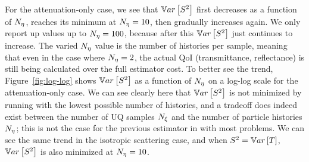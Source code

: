 For the attenuation-only case, we see that $\mathbb{V}ar\left[S^2\right]$ first decreases as a function of ${N_\eta}$, reaches its minimum at ${N_\eta}=10$, then gradually increases again. We only report up values up to ${N_\eta}=100$, because after this $\mathbb{V}ar\left[S^2\right]$ just continues to increase. The varied ${N_\eta}$ value is the number of histories per sample, meaning that even in the case where ${N_\eta}=2$, the actual QoI (transmittance, reflectance) is still being calculated over the full estimator cost. To better see the trend, Figure~\ref{fig:log-log} shows $\mathbb{V}ar\left[S^2\right]$ as a function of ${N_\eta}$ on a log-log scale for the attenuation-only case. We can see clearly here that $\mathbb{V}ar\left[S^2\right]$ is not minimized by running with the lowest possible number of histories, and a tradeoff does indeed exist between the number of UQ samples ${N_\xi}$ and the number of particle histories ${N_\eta}$; this is not the case for the previous estimator in \cite{Clements2021} with most problems. We can see the same trend in the isotropic scattering case, and when $S^2 = \mathbb{V}ar\left[T\right]$, $\mathbb{V}ar\left[S^2\right]$ is also minimized at ${N_\eta}=10$.

